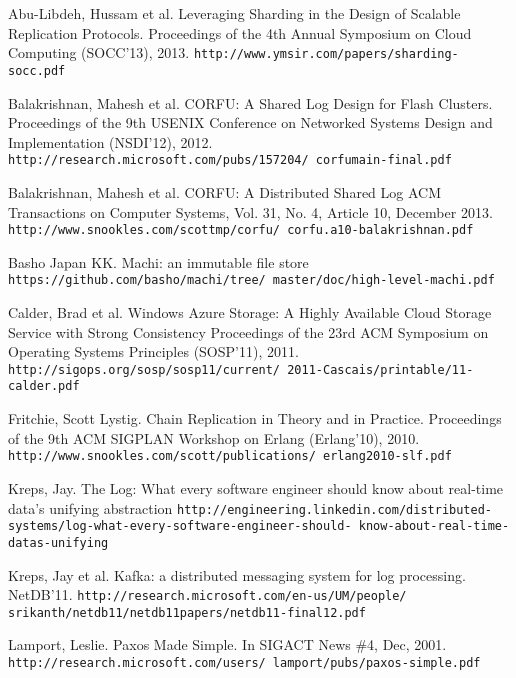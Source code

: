 \documentclass[preprint,10pt]{sigplanconf}
\begin{document}

\begin{thebibliography}{}
\softraggedright

Abu-Libdeh, Hussam et al.
Leveraging Sharding in the Design of Scalable Replication Protocols.
Proceedings of the 4th Annual Symposium on Cloud Computing (SOCC'13), 2013.
{\tt http://www.ymsir.com/papers/sharding-socc.pdf}

Balakrishnan, Mahesh et al.
CORFU: A Shared Log Design for Flash Clusters.
Proceedings of the 9th USENIX Conference on Networked Systems Design
and Implementation (NSDI'12), 2012.
{\tt http://research.microsoft.com/pubs/157204/ corfumain-final.pdf}

Balakrishnan, Mahesh et al.
CORFU: A Distributed Shared Log
ACM Transactions on Computer Systems, Vol. 31, No. 4, Article 10, December 2013.
{\tt http://www.snookles.com/scottmp/corfu/ corfu.a10-balakrishnan.pdf}

Basho Japan KK.
Machi: an immutable file store
{\tt https://github.com/basho/machi/tree/ master/doc/high-level-machi.pdf}

Calder, Brad et al.
Windows Azure Storage: A Highly Available Cloud Storage Service with Strong Consistency
Proceedings of the 23rd ACM Symposium on Operating Systems Principles (SOSP'11), 2011.
{\tt http://sigops.org/sosp/sosp11/current/ 2011-Cascais/printable/11-calder.pdf}

Fritchie, Scott Lystig.
Chain Replication in Theory and in Practice.
Proceedings of the 9th ACM SIGPLAN Workshop on Erlang (Erlang'10), 2010.
{\tt http://www.snookles.com/scott/publications/ erlang2010-slf.pdf}

Kreps, Jay.
The Log: What every software engineer should know about real-time data's unifying abstraction
{\tt http://engineering.linkedin.com/distributed-
  systems/log-what-every-software-engineer-should-
  know-about-real-time-datas-unifying}

Kreps, Jay et al.
Kafka: a distributed messaging system for log processing.
NetDB’11.
{\tt http://research.microsoft.com/en-us/UM/people/
  srikanth/netdb11/netdb11papers/netdb11-final12.pdf}

Lamport, Leslie.
Paxos Made Simple.
In SIGACT News \#4, Dec, 2001.
{\tt http://research.microsoft.com/users/ lamport/pubs/paxos-simple.pdf}


\end{thebibliography}
\end{document}
